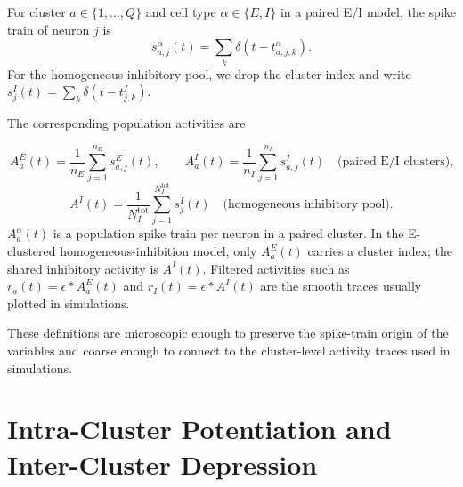 For cluster $a\in\{1,\ldots,Q\}$ and cell type $\alpha\in\{E,I\}$ in a paired
E/I model, the spike train of neuron $j$ is
%
\begin{equation}
  s_{a,j}^{\alpha}(t)
  =
  \sum_k \delta\!\left(t-t_{a,j,k}^{\alpha}\right).
  \label{eq:ch05-cluster-spike-train}
\end{equation}
%
For the homogeneous inhibitory pool, we drop the cluster index and write
$s_j^I(t)=\sum_k\delta(t-t_{j,k}^I)$.

The corresponding population activities are
%
\begin{keyequation}
\begin{equation}
  A_a^E(t)
  =
  \frac{1}{n_E}\sum_{j=1}^{n_E}s_{a,j}^E(t),
  \qquad
  A_a^I(t)
  =
  \frac{1}{n_I}\sum_{j=1}^{n_I}s_{a,j}^I(t)
  \quad\text{(paired E/I clusters),}
  \label{eq:ch05-paired-population-activities}
\end{equation}
\begin{equation}
  A^I(t)
  =
  \frac{1}{N_I^{\mathrm{tot}}}\sum_{j=1}^{N_I^{\mathrm{tot}}}s_j^I(t)
  \quad\text{(homogeneous inhibitory pool).}
  \label{eq:ch05-homogeneous-inhibitory-activity}
\end{equation}
\tcblower
$A_a^\alpha(t)$ is a population spike train per neuron in a paired cluster. In
the E-clustered homogeneous-inhibition model, only $A_a^E(t)$ carries a cluster
index; the shared inhibitory activity is $A^I(t)$. Filtered activities such as
$r_a(t)=\epsilon*A_a^E(t)$ and $r_I(t)=\epsilon*A^I(t)$ are the smooth traces
usually plotted in simulations.
\end{keyequation}

\noindent These definitions are microscopic enough to preserve the spike-train
origin of the variables and coarse enough to connect to the cluster-level
activity traces used in simulations.

\section{Intra-Cluster Potentiation and Inter-Cluster Depression}
\label{sec:intra-inter-weights}

